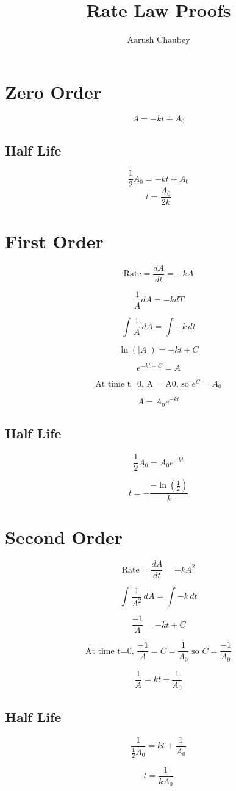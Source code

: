 \documentclass{article}
\title{Rate Law Proofs}
\author{Aarush Chaubey}
\date{}
\begin{document}
\maketitle

\section{Zero Order}
$$\boxed{A = -kt + A_0}$$
\subsection{Half Life}
$$\frac{1}{2}A_0 = -kt + A_0$$
$$\boxed{t = \frac{A_0}{2k}}$$


\section{First Order}

$$\textrm{Rate} = \frac{dA}{dt} = -kA$$

$$\frac{1}{A}dA = -k dT$$

$$\int{\frac{1}{A}} \, dA = \int{-k} \, dt$$

$$\ln(|A|) = -kt+C$$

$$e^{-kt+C} = A$$

$$\textrm{At time t=0, A = A0, so } e^C = A_0$$

$$\boxed{A=A_0e^{-kt}}$$

\subsection{Half Life}

$$\frac{1}{2}A_0 = A_0e^{-kt}$$

$$\boxed{t = -\frac{-\ln({\frac{1}{2}})}{k}}$$

\section{Second Order}

$$\textrm{Rate} = \frac{dA}{dt} = -kA^2$$

$$\int{\frac{1}{A^2}} \, dA = \int{-k} \, dt$$

$$\frac{-1}{A} = -kt+C$$

$$\textrm{At time t=0, } \frac{-1}{A} = C  = \frac{1}{A_0} \textrm{ so } C = \frac{-1}{A_0}$$

$$\boxed{\frac{1}{A} = kt + \frac{1}{A_0}}$$

\subsection{Half Life}
$$\frac{1}{\frac{1}{2}A_0} = kt + \frac{1}{A_0}$$

$$\boxed{t = \frac{1}{kA_0}}$$
\end{document}
